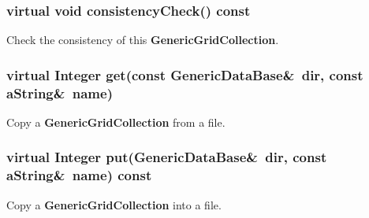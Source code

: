 \documentclass{article}
\begin{document}
  \subsubsection{virtual void consistencyCheck() const}
  \label{GenericGridCollection::consistencyCheck() const}
    Check the consistency of this \textbf{GenericGridCollection}.

  \subsubsection{virtual Integer get(const GenericDataBase\&~dir, const aString\&~name)}
  \label{GenericGridCollection::get(dir,name)}
    Copy a \textbf{GenericGridCollection} from a file.

  \subsubsection{virtual Integer put(GenericDataBase\&~dir, const aString\&~name) const}
  \label{GenericGridCollection::put(dir,name) const}
    Copy a \textbf{GenericGridCollection} into a file.
\end{document}
